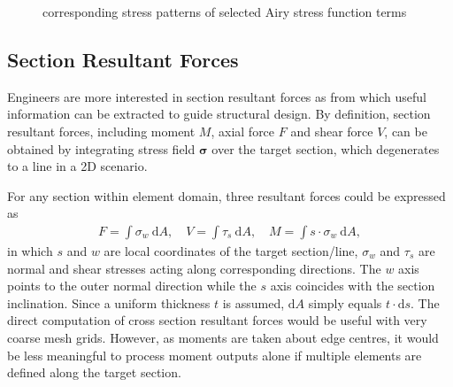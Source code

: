 \documentclass[3p,review,sort&compress,11pt,fleqn]{elsarticle}
\newcommand*{\md}[1]{\mathrm{d}#1}
\newcommand*{\mathbold}{\bm}
\begin{document}
\begin{figure}[H]
\caption{corresponding stress patterns of selected Airy stress function terms}\label{fig:stress_patterns}
\end{figure}
\subsection{Section Resultant Forces}
Engineers are more interested in section resultant forces as from which useful information can be extracted to guide structural design. By definition, section resultant forces, including moment $M$, axial force $F$ and shear force $V$, can be obtained by integrating stress field $\mathbold{\sigma}$ over the target section, which degenerates to a line in a 2D scenario.

For any section within element domain, three resultant forces could be expressed as
\begin{gather}\label{eq:resultant_force}
F=\int\sigma_w~\md{A},\quad{}V=\int\tau_s~\md{A},\quad{}M=\int{}s\cdot\sigma_w~\md{A},
\end{gather}
in which $s$ and $w$ are local coordinates of the target section/line, $\sigma_w$ and $\tau_s$ are normal and shear stresses acting along corresponding directions. The $w$ axis points to the outer normal direction while the $s$ axis coincides with the section inclination. Since a uniform thickness $t$ is assumed, $\md{A}$ simply equals $t\cdot\md{s}$. The direct computation of cross section resultant forces would be useful with very coarse mesh grids. However, as moments are taken about edge centres, it would be less meaningful to process moment outputs alone if multiple elements are defined along the target section.
\end{document}
